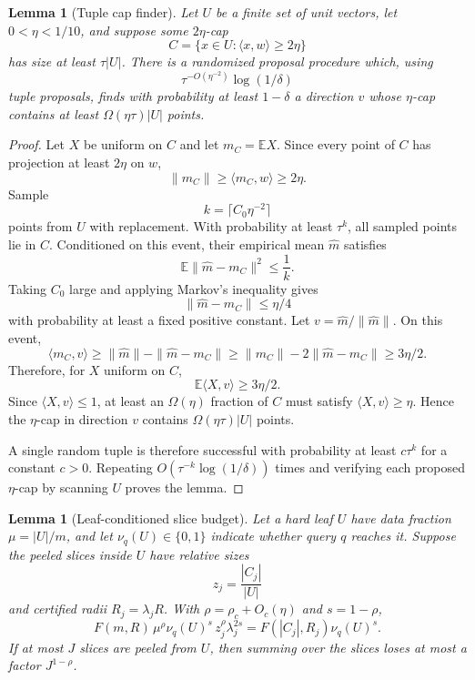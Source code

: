 \documentclass[10pt]{article}
\newtheorem{lemma}[theorem]{Lemma}
\theoremstyle{definition}
\newcommand{\E}{\mathbb{E}}
\newcommand{\ip}[2]{\langle #1,#2\rangle}
\begin{document}
\begin{lemma}[Tuple cap finder]\label{lem:tuple-cap-finder}
   Let $U$ be a finite set of unit vectors, let $0<\eta<1/10$, and suppose some $2\eta$-cap
   \[
      C=\{x\in U:\ip{x}{w}\ge2\eta\}
   \]
   has size at least $\tau |U|$. There is a randomized proposal procedure which, using
   \[
      \tau^{-O(\eta^{-2})}\log(1/\delta)
   \]
   tuple proposals, finds with probability at least $1-\delta$ a direction $v$ whose $\eta$-cap contains at least $\Omega(\eta\tau)|U|$ points.
\end{lemma}

\begin{proof}
   Let $X$ be uniform on $C$ and let $m_C=\E X$. Since every point of $C$ has projection at least $2\eta$ on $w$,
   \[
      \|m_C\|\ge \ip{m_C}{w}\ge2\eta.
   \]
   Sample
   \[
      k=\lceil C_0\eta^{-2}\rceil
   \]
   points from $U$ with replacement. With probability at least $\tau^k$, all sampled points lie in $C$. Conditioned on this event, their empirical mean $\widehat m$ satisfies
   \[
      \E\|\widehat m-m_C\|^2\le \frac1k.
   \]
   Taking $C_0$ large and applying Markov's inequality gives
   \[
      \|\widehat m-m_C\|\le\eta/4
   \]
   with probability at least a fixed positive constant. Let $v=\widehat m/\|\widehat m\|$. On this event,
   \[
      \ip{m_C}{v}
      \ge
      \|\widehat m\|-\|\widehat m-m_C\|
      \ge
      \|m_C\|-2\|\widehat m-m_C\|
      \ge
      3\eta/2.
   \]
   Therefore, for $X$ uniform on $C$,
   \[
      \E\ip{X}{v}\ge3\eta/2.
   \]
   Since $\ip{X}{v}\le1$, at least an $\Omega(\eta)$ fraction of $C$ must satisfy $\ip{X}{v}\ge\eta$. Hence the $\eta$-cap in direction $v$ contains $\Omega(\eta\tau)|U|$ points.

   A single random tuple is therefore successful with probability at least $c\tau^k$ for a constant $c>0$. Repeating $O(\tau^{-k}\log(1/\delta))$ times and verifying each proposed $\eta$-cap by scanning $U$ proves the lemma.
\end{proof}

\begin{lemma}[Leaf-conditioned slice budget]\label{lem:slice-budget}
   Let a hard leaf $U$ have data fraction $\mu=|U|/m$, and let $\nu_q(U)\in\{0,1\}$ indicate whether query $q$ reaches it. Suppose the peeled slices inside $U$ have relative sizes
   \[
      z_j=\frac{|C_j|}{|U|}
   \]
   and certified radii $R_j=\lambda_jR$. With $\rho=\rho_c+O_c(\eta)$ and $s=1-\rho$,
   \[
      F(m,R)\,\mu^\rho\nu_q(U)^s\,z_j^\rho\lambda_j^{2s}
      =
      F(|C_j|,R_j)\nu_q(U)^s.
   \]
   If at most $J$ slices are peeled from $U$, then summing over the slices loses at most a factor $J^{1-\rho}$.
\end{lemma}
\end{document}
